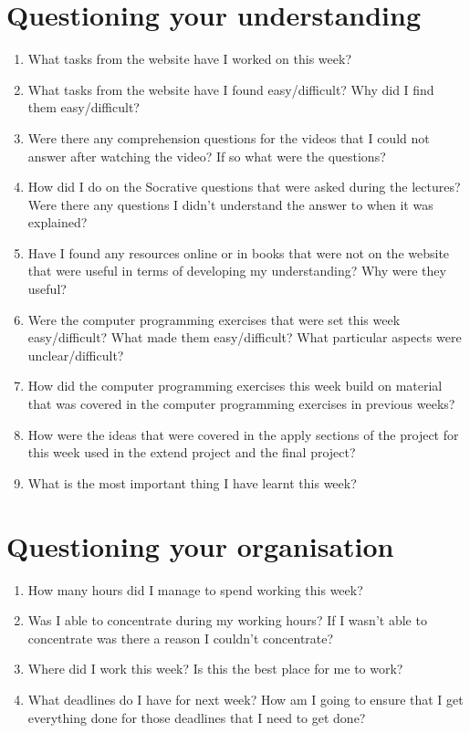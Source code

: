 \documentclass[a4paper]{article}
\begin{document}
\section*{Questioning your understanding}

\begin{enumerate}
\item What tasks from the website have I worked on this week?

\item What tasks from the website have I found easy/difficult?  Why did I find them easy/difficult?

\item Were there any comprehension questions for the videos that I could not answer after watching the video?  If so what were the questions?

\item How did I do on the Socrative questions that were asked during the lectures?  Were there any questions I didn't understand the answer to when it was explained?

\item Have I found any resources online or in books that were not on the website that were useful in terms of developing my understanding?  Why were they useful?

\item Were the computer programming exercises that were set this week easy/difficult?  What made them easy/difficult?  What particular aspects were unclear/difficult?

\item How did the computer programming exercises this week build on material that was covered in the computer programming exercises in previous weeks?   

\item How were the ideas that were covered in the apply sections of the project for this week used in the extend project and the final project? 

\item What is the most important thing I have learnt this week?
\end{enumerate}

\section*{Questioning your organisation}

\begin{enumerate}
\item How many hours did I manage to spend working this week?

\item Was I able to concentrate during my working hours?  If I wasn't able to concentrate was there a reason I couldn't concentrate?

\item Where did I work this week?  Is this the best place for me to work?

\item What deadlines do I have for next week?  How am I going to ensure that I get everything done for those deadlines that I need to get done?

\end{enumerate}
\end{document}
